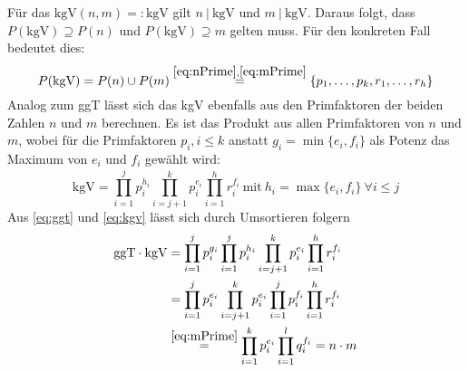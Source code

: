 \documentclass[DIN, pagenumber=false, fontsize=11pt, parskip=half]{scrartcl}
\newcommand{\ggt}{\text{ggT}}
\newcommand{\kgv}{\text{kgV}}
\begin{document}
\begin{enumerate}[label=\alph*)]
        Für das $\kgv(n, m) =: \kgv$ gilt $n \ | \ \kgv$ und $m \ | \ \kgv$. Daraus folgt, dass $P(\kgv) \supseteq P(n)$ und $P(\kgv) \supseteq m$ gelten muss.
        Für den konkreten Fall bedeutet dies:
        \begin{equation}
            P(\kgv) = P(n) \cup P(m) \stackrel{\ref{eq:nPrime}, \ref{eq:mPrime}}{=} \{p_1, \dots, p_k, r_1, \dots, r_h\} \label{eq:PkgV}
        \end{equation}
        Analog zum ggT lässt sich das kgV ebenfalls aus den Primfaktoren der beiden Zahlen $n$ und $m$ berechnen. Es ist das Produkt aus allen Primfaktoren
        von $n$ und $m$, wobei für die Primfaktoren $p_i, i \leq k$ anstatt $g_i = \min\{e_i, f_i\}$ als Potenz das Maximum von $e_i$ und $f_i$ gewählt wird:
        \begin{equation}
            \kgv = \prod_{i=1}^j{p_i^{h_i}} \prod_{i=j+1}^k{p_i^{e_i}} \prod_{i=1}^h{r_i^{f_i}} \ 
            \text{mit} \ h_i = \max\{e_i, f_i\} \ \forall i \leq j \label{eq:kgv}
        \end{equation}
        Aus \cref{eq:ggt} und \ref{eq:kgv} lässt sich durch Umsortieren folgern
        \begin{align}
            \ggt\cdot \kgv &= \prod_{i=1}^j{p_i^{g_i}} \prod_{i=1}^j{p_i^{h_i}} \prod_{i=j+1}^k{p_i^{e_i}} \prod_{i=1}^h{r_i^{f_i}} \\
            &= \prod_{i=1}^j{p_i^{e_i}} \prod_{i=j+1}^k{p_i^{e_i}} \prod_{i=1}^j{p_i^{f_i}} \prod_{i=1}^h{r_i^{f_i}} \\
            &\stackrel{\ref{eq:mPrime}}{=} \prod_{i=1}^k{p_i^{e_i}} \prod_{i=1}^l{q_i^{f_i}} = n \cdot m \label{eq:ggtTimeskgv}
        \end{align}


\end{enumerate}
\end{document}
